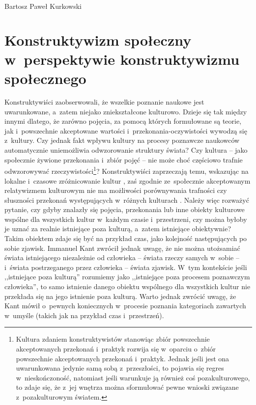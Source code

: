 \begin{artplenv}{Bartosz Paweł Kurkowski}
\section{Konstruktywizm społeczny w~perspektywie konstruktywizmu społecznego}

Konstruktywiści zaobserwowali, że wszelkie poznanie naukowe jest uwarunkowane, a~zatem niejako zniekształcone
kulturowo. Dzieje się tak między innymi dlatego, że zarówno pojęcia, za pomocą których formułowane są teorie,
jak i~powszechnie akceptowane wartości i~przekonania-oczywistości wywodzą się z~kultury. Czy jednak fakt wpływu kultury na
procesy poznawcze naukowców automatycznie uniemożliwia odwzorowanie struktury świata? Czy kultura -- jako społecznie
żywione przekonania i~zbiór pojęć -- nie może choć częściowo trafnie odwzorowywać rzeczywistości\footnote{Kultura
zdaniem konstruktywistów stanowiąc zbiór powszechnie akceptowanych przekonań i~praktyk rozwija się w~oparciu o~zbiór
powszechnie akceptowanych przekonań i~praktyk. Jednak jeśli jest ona uwarunkowana jedynie samą sobą z~przeszłości, to
pojawia się regres w~nieskończoność, natomiast jeśli warunkuje ją również coś pozakulturowego, to zdaje się, że z~jej
wnętrza można sformułować pewne wnioski związane z~pozakulturowym światem.}? Konstruktywiści zaprzeczają temu,
wskazując na lokalne i~czasowe zróżnicowanie kultur
\parencite[s.~33]{zboron_teorie_2009},
zaś zgodnie
ze~społecznie akceptowanym relatywizmem kulturowym nie ma możliwości porównywania trafności czy słuszności przekonań
występujących w~różnych kulturach
\parencite[s.~76]{przymenski_socjologia:_2008}.
Należy więc rozważyć pytanie, czy
gdyby znalazły się pojęcia, przekonania lub inne obiekty kulturowe wspólne dla wszystkich kultur w~każdym
czasie i~przestrzeni, czy można byłoby je uznać za realnie istniejące poza kulturą, a~zatem istniejące obiektywnie? Takim
obiektem zdaje się być na przykład czas, jako kolejność następujących po sobie zjawisk. Immanuel Kant zwrócił jednak uwagę, że
nie można utożsamiać świata istniejącego niezależnie od człowieka -- świata rzeczy samych w~sobie -- i~świata
postrzeganego przez człowieka -- świata zjawisk. W~tym kontekście jeśli ,,istniejące poza kulturą'' rozumiemy jako
,,istniejące poza procesem poznawczym człowieka'', to samo istnienie danego obiektu wspólnego dla wszystkich kultur nie
przekłada się na jego istnienie poza kulturą. Warto jednak zwrócić uwagę, że Kant mówił o~pewnych
koniecznych w~procesie poznania kategoriach zawartych w~umyśle (takich jak na przykład czas i~przestrzeń).

\end{artplenv}
